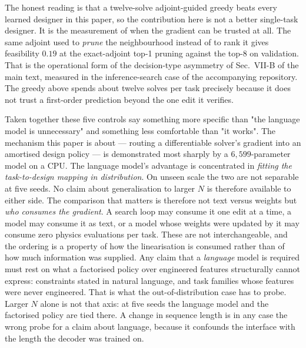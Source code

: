 The honest reading is that a twelve-solve adjoint-guided greedy beats every learned
designer in this paper, so the contribution here is not a better single-task designer. It
is the measurement of when the gradient can be trusted at all. The same adjoint used to \emph{prune} the neighbourhood instead of to rank it gives
feasibility $0.19$ at the exact-adjoint top-1 pruning against the top-8 on
validation.  That is the operational form of the decision-type asymmetry of
Sec.~VII-B of the main text, measured in the inference-search case of the accompanying
repository.  The greedy above
spends about twelve solves per task precisely because it does not trust a first-order
prediction beyond the one edit it verifies.

Taken together these five controls say something more specific than "the language
model is unnecessary" and something less comfortable than "it works". The mechanism
this paper is about --- routing a differentiable solver's gradient into an amortised
design policy --- is demonstrated most sharply by a $6{,}599$-parameter model on a
CPU. The language model's advantage is concentrated in \emph{fitting the task-to-design
mapping in distribution}.  On unseen scale the two are not separable at five seeds.
No claim about generalisation to larger $N$ is therefore available to either side. The comparison that matters is therefore not text versus weights but \emph{who
consumes the gradient}.  A search loop may consume it one edit at a time, a model may
consume it as text, or a model whose weights were updated by it may consume zero
physics evaluations per task.
These are not interchangeable, and the ordering is a property of how the
linearisation is consumed rather than of how much information was supplied. Any claim that a \emph{language} model is required must rest on what a factorised
policy over engineered features structurally cannot express: constraints stated in
natural language, and task families whose features were never engineered.  That is
what the out-of-distribution case has to probe. Larger $N$ alone is not that axis: at five seeds the language model and the
factorised policy are tied there.  A change in sequence length is in any case the
wrong probe for a claim about language, because it confounds the interface with the
length the decoder was trained on.


